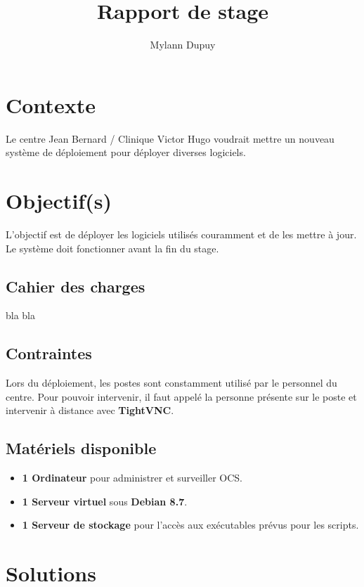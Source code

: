 \documentclass[11pt,a4paper,oneside]{article}
\author{Mylann Dupuy}
\title{Rapport de stage}
\begin{document}
\maketitle
\newpage
\tableofcontents
\newpage
\section{Contexte}
Le centre Jean Bernard / Clinique Victor Hugo voudrait mettre un nouveau système de déploiement pour déployer diverses logiciels.
\section{Objectif(s)}
L'objectif est de déployer les logiciels utilisés couramment et de les mettre à jour. Le système doit fonctionner avant la fin du stage. 
\subsection{Cahier des charges}
bla bla
\\
\subsection{Contraintes}
Lors du déploiement, les postes sont constamment utilisé par le personnel du centre. Pour pouvoir intervenir, il faut appelé la personne présente sur le poste et intervenir à distance avec \textbf{TightVNC}.
\subsection{Matériels disponible}
\begin{itemize}
	\item \textbf{1 Ordinateur} pour administrer et surveiller OCS.
	\item \textbf{1 Serveur virtuel} sous 	\textbf{Debian 8.7}.
	\item \textbf{1 Serveur de stockage}  pour l'accès aux exécutables prévus pour les scripts. 

\end{itemize}
\section{Solutions}
\end{document}
